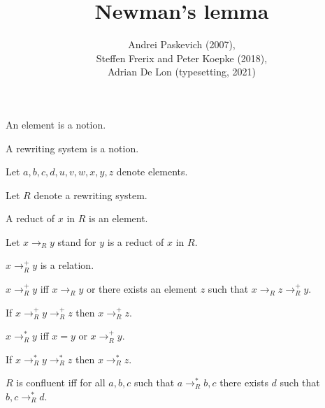 \documentclass{article}
\title{Newman's lemma}
\author{Andrei Paskevich (2007), \\
Steffen Frerix and Peter Koepke (2018), \\
Adrian De Lon (typesetting, 2021)}
\date{}
\newcommand{\reduces}[1]{\to_{#1}}
\newcommand{\reducesTC}[1]{\to_{#1}^{+}}
\newcommand{\reducesTCR}[1]{\to_{#1}^{*}}
\begin{document}

  \maketitle

  \begin{forthel}

    \begin{signature}
      An element is a notion.
    \end{signature}

    \begin{signature}
      A rewriting system is a notion.
    \end{signature}

    Let $a,b,c,d,u,v,w,x,y,z$ denote elements.

    Let $R$ denote a rewriting system.

    \begin{signature}[Reduct]
      A reduct of $x$ in $R$ is an element.
    \end{signature}

    Let $x \reduces{R} y$ stand for $y$ is a reduct of $x$ in $R$.

    \begin{signature}
      $x \reducesTC{R} y$ is a relation.
    \end{signature}

    \begin{axiom}
      $x \reducesTC{R} y$ iff $x \reduces{R} y$
      or there exists an element $z$ such that
      $x \reduces{R} z \reducesTC{R} y$.
    \end{axiom}

    \begin{axiom}
      If $x \reducesTC{R} y \reducesTC{R} z$ then $x \reducesTC{R} z$.
    \end{axiom}

    \begin{definition}
      $x \reducesTCR{R} y$ iff $x = y$ or $x \reducesTC{R} y$.
    \end{definition}

    \begin{lemma}
      If $x \reducesTCR{R} y \reducesTCR{R} z$ then $x \reducesTCR{R} z$.
    \end{lemma}

    \begin{definition}
      $R$ is confluent iff for all $a,b,c$ such that $a \reducesTCR{R} b,c$ there exists $d$ such that $b,c \reducesTCR{R} d$.
    \end{definition}


\end{forthel}
\end{document}
